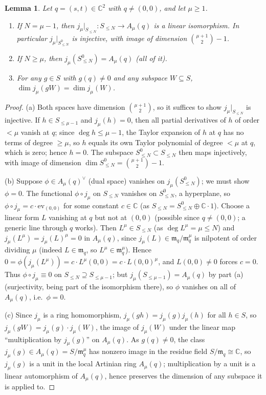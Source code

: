 \documentclass[11pt]{amsart}
\theoremstyle{plain}
\newtheorem{lemma}[theorem]{Lemma}
\theoremstyle{definition}
\newcommand{\CC}{\mathbb{C}}
\newcommand{\mfrak}{\mathfrak{m}}
\begin{document}
\begin{lemma}\label{lem:jet}
Let $q=(s,t)\in\CC^2$ with $q\ne(0,0)$, and let $\mu\ge1$.
\begin{enumerate}[label=(\alph*)]
\item If $N=\mu-1$, then $j_\mu|_{S_{\le N}} : S_{\le N}\to A_\mu(q)$ is a linear isomorphism. In particular $j_\mu|_{S^0_{\le N}}$ is injective, with image of dimension $\binom{\mu+1}{2}-1$.
\item If $N\ge \mu$, then $j_\mu(S^0_{\le N}) = A_\mu(q)$ (all of it).
\item For any $g\in S$ with $g(q)\ne0$ and any subspace $W\subseteq S$, $\dim j_\mu(gW) = \dim j_\mu(W)$.
\end{enumerate}
\end{lemma}

\begin{proof}
(a) Both spaces have dimension $\binom{\mu+1}2$, so it suffices to show $j_\mu|_{S_{\le N}}$ is injective. If $h\in S_{\le \mu-1}$ and $j_\mu(h)=0$, then all partial derivatives of $h$ of order $<\mu$ vanish at $q$; since $\deg h\le \mu-1$, the Taylor expansion of $h$ at $q$ has no terms of degree $\ge\mu$, so $h$ equals its own Taylor polynomial of degree $<\mu$ at $q$, which is zero; hence $h=0$. The subspace $S^0_{\le N}\subset S_{\le N}$ then maps injectively, with image of dimension $\dim S^0_{\le N}=\binom{\mu+1}2-1$.

(b) Suppose $\phi\in A_\mu(q)^\vee$ (dual space) vanishes on $j_\mu(S^0_{\le N})$; we must show $\phi=0$. The functional $\phi\circ j_\mu$ on $S_{\le N}$ vanishes on $S^0_{\le N}$, a hyperplane, so $\phi\circ j_\mu = c\cdot \mathrm{ev}_{(0,0)}$ for some constant $c\in\CC$ (as $S_{\le N} = S^0_{\le N}\oplus\CC\cdot1$). Choose a linear form $L$ vanishing at $q$ but not at $(0,0)$ (possible since $q\ne(0,0)$; a generic line through $q$ works). Then $L^\mu\in S_{\le N}$ (as $\deg L^\mu=\mu\le N$) and $j_\mu(L^\mu)=j_\mu(L)^\mu=0$ in $A_\mu(q)$, since $j_\mu(L)\in \mfrak_q/\mfrak_q^\mu$ is nilpotent of order dividing $\mu$ (indeed $L\in\mfrak_q$, so $L^\mu\in\mfrak_q^\mu$). Hence $0=\phi(j_\mu(L^\mu)) = c\cdot L^\mu(0,0) = c\cdot L(0,0)^\mu$, and $L(0,0)\ne0$ forces $c=0$. Thus $\phi\circ j_\mu\equiv 0$ on $S_{\le N}\supseteq S_{\le\mu-1}$; but $j_\mu(S_{\le\mu-1})=A_\mu(q)$ by part (a) (surjectivity, being part of the isomorphism there), so $\phi$ vanishes on all of $A_\mu(q)$, i.e.\ $\phi=0$.

(c) Since $j_\mu$ is a ring homomorphism, $j_\mu(gh)=j_\mu(g)j_\mu(h)$ for all $h\in S$, so $j_\mu(gW)=j_\mu(g)\cdot j_\mu(W)$, the image of $j_\mu(W)$ under the linear map ``multiplication by $j_\mu(g)$'' on $A_\mu(q)$. As $g(q)\ne0$, the class $j_\mu(g)\in A_\mu(q)=S/\mfrak_q^\mu$ has nonzero image in the residue field $S/\mfrak_q\cong\CC$, so $j_\mu(g)$ is a unit in the local Artinian ring $A_\mu(q)$; multiplication by a unit is a linear automorphism of $A_\mu(q)$, hence preserves the dimension of any subspace it is applied to.
\end{proof}
\end{document}
